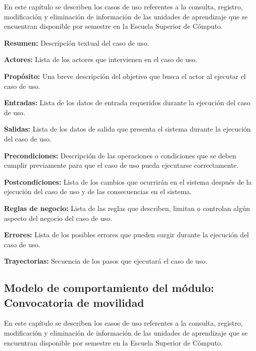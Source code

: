 En este capítulo se describen los casos de uso referentes a la consulta, registro, modificación y eliminación de información de las unidades de aprendizaje que se encuentran disponible por semestre en la Escuela Superior de Cómputo. \bigskip

\begin{objetivos}
	\item {\bf Resumen:} Descripción textual del caso de uso.
	\item {\bf Actores:} Lista de los actores que intervienen en el caso de uso.
	\item {\bf Propósito:} Una breve descripción del objetivo que busca el actor al ejecutar el caso de uso.
	\item {\bf Entradas:} Lista de los datos de entrada requeridos durante la ejecución del caso de uso.
	\item {\bf Salidas:} Lista de los datos de salida que presenta el sistema durante la ejecución del caso de uso.
	\item {\bf Precondiciones:} Descripción de las operaciones o condiciones que se deben cumplir previamente para que el caso de uso pueda ejecutarse correctamente.
	\item {\bf Postcondiciones:} Lista de los cambios que ocurrirán en el sistema después de la ejecución del caso de uso y de las consecuencias en el sistema.
	\item {\bf Reglas de negocio:} Lista de las reglas que describen, limitan o controlan algún aspecto del negocio del caso de uso.
	\item {\bf Errores:} Lista de los posibles errores que pueden surgir durante la ejecución del caso de uso.
	\item {\bf Trayectorias:} Secuencia de los pasos que ejecutará el caso de uso.
\end{objetivos}

\newpage
\subsection{Modelo de comportamiento del módulo: Convocatoria de movilidad
	 \label{chp:modeloComportamientoMovilidad}}

En este capítulo se describen los casos de uso referentes a la consulta, registro, modificación y eliminación de información de las unidades de aprendizaje que se encuentran disponible por semestre en la Escuela Superior de Cómputo. \bigskip

